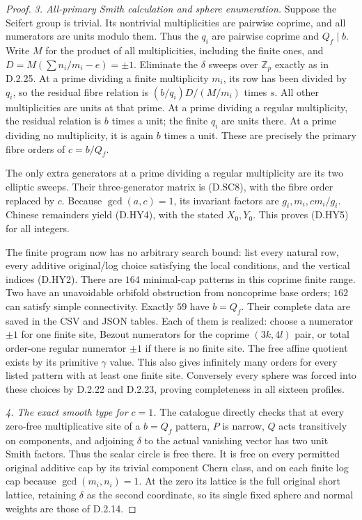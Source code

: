 \begin{proof}
\emph{3. All-primary Smith calculation and sphere enumeration.}
Suppose the Seifert group is trivial. Its nontrivial multiplicities
are pairwise coprime, and all numerators are units modulo them.
Thus the $q_i$ are pairwise coprime and $Q_f\mid b$.
Write $M$ for the product of all multiplicities, including the
finite ones, and $D=M(\sum n_i/m_i-e)=\pm1$.
Eliminate the $\delta$ sweeps over $\mathbb Z_p$ exactly as in
D.2.25. At a prime dividing a finite multiplicity $m_i$, its row
has been divided by $q_i$, so the residual fibre relation is
$(b/q_i)D/(M/m_i)$ times $s$. All other multiplicities are units
at that prime. At a prime dividing a regular multiplicity, the
residual relation is $b$ times a unit; the finite $q_i$ are units
there. At a prime dividing no multiplicity, it is again $b$ times
a unit. These are precisely the primary fibre orders of
$c=b/Q_f$.

The only extra generators at a prime dividing a regular multiplicity
are its two elliptic sweeps. Their three-generator matrix is
(D.SC8), with the fibre order replaced by $c$. Because
$\gcd(a,c)=1$, its invariant factors are
$g_i,m_i,cm_i/g_i$. Chinese remainders yield (D.HY4), with the
stated $X_0,Y_0$. This proves (D.HY5) for all integers.

The finite program now has no arbitrary search bound: list every
natural row, every additive original/log choice satisfying the
local conditions, and the vertical indices (D.HY2). There are
$164$ minimal-cap patterns in this coprime finite range. Two have
an unavoidable orbifold obstruction from noncoprime base orders;
$162$ can satisfy simple connectivity. Exactly $59$ have $b=Q_f$.
Their complete data are saved in the CSV and JSON tables. Each
of them is realized: choose a numerator $\pm1$ for one finite
site, Bezout numerators for the coprime $(3k,4l)$ pair, or total
order-one regular numerator $\pm1$ if there is no finite site.
The free affine quotient exists by its primitive $\gamma$ value.
This also gives infinitely many orders for every listed pattern
with at least one finite site. Conversely every sphere was forced
into these choices by D.2.22 and D.2.23, proving completeness in
all sixteen profiles.

\emph{4. The exact smooth type for $c=1$.}
The catalogue directly checks that at every zero-free multiplicative
site of a $b=Q_f$ pattern, $P$ is narrow, $Q$ acts transitively on
components, and adjoining $\delta$ to the actual vanishing vector
has two unit Smith factors. Thus the scalar circle is free there.
It is free on every permitted original additive cap by its trivial
component Chern class, and on each finite log cap because
$\gcd(m_i,n_i)=1$. At the zero its lattice is the full original
short lattice, retaining $\delta$ as the second coordinate, so its
single fixed sphere and normal weights are those of D.2.14.


\end{proof}
